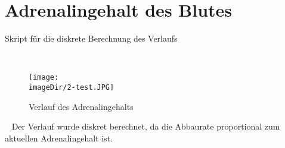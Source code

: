 \section{Adrenalingehalt des Blutes}
\begin{code}
	\caption{Skript für die diskrete Berechnung des Verlaufs}
	\label{source:2-script}
\end{code}
\ \newpage

\begin{figure}[h]
\centering
\texttt{[image: \\imageDir/2-test.JPG]}
\caption{Verlauf des Adrenalingehalts}
\label{fig:1-c-modell}
\end{figure}
\ \newline
Der Verlauf wurde diskret berechnet, da die Abbaurate proportional zum aktuellen Adrenalingehalt ist.
\newpage